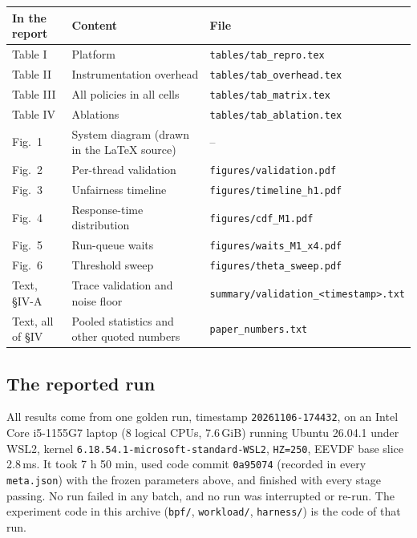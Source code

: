 \documentclass[10.5pt,a4paper]{article}
\newcommand{\f}[1]{\texttt{#1}}
\begin{document}
\begin{center}
\begin{tabularx}{\textwidth}{@{}lLl@{}}
\toprule
\textbf{In the report} & \textbf{Content} & \textbf{File} \\
\midrule
Table I & Platform & \f{tables/tab\_repro.tex} \\
Table II & Instrumentation overhead & \f{tables/tab\_overhead.tex} \\
Table III & All policies in all cells & \f{tables/tab\_matrix.tex} \\
Table IV & Ablations & \f{tables/tab\_ablation.tex} \\
Fig.~1 & System diagram (drawn in the LaTeX source) & -- \\
Fig.~2 & Per-thread validation & \f{figures/validation.pdf} \\
Fig.~3 & Unfairness timeline & \f{figures/timeline\_h1.pdf} \\
Fig.~4 & Response-time distribution & \f{figures/cdf\_M1.pdf} \\
Fig.~5 & Run-queue waits & \f{figures/waits\_M1\_x4.pdf} \\
Fig.~6 & Threshold sweep & \f{figures/theta\_sweep.pdf} \\
Text, \S IV-A & Trace validation and noise floor & \f{summary/validation\_<timestamp>.txt} \\
Text, all of \S IV & Pooled statistics and other quoted numbers & \f{paper\_numbers.txt} \\
\bottomrule
\end{tabularx}
\end{center}

\subsection{The reported run}
All results come from one golden run, timestamp \f{20261106-174432}, on an Intel Core i5-1155G7 laptop (8 logical CPUs, 7.6\,GiB) running Ubuntu 26.04.1 under WSL2, kernel \f{6.18.54.1-microsoft-standard-WSL2}, \f{HZ=250}, EEVDF base slice 2.8\,ms. It took 7 h 50 min, used code commit \f{0a95074} (recorded in every \f{meta.json}) with the frozen parameters above, and finished with every stage passing. No run failed in any batch, and no run was interrupted or re-run. The experiment code in this archive (\f{bpf/}, \f{workload/}, \f{harness/}) is the code of that run.
\end{document}
